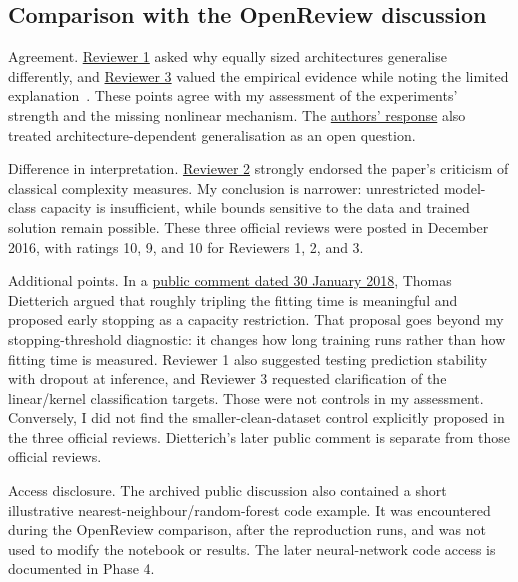 \documentclass[11pt]{article}
\begin{document}
\subsection{Comparison with the OpenReview discussion}

Agreement. \href{https://openreview.net/forum?id=Sy8gdB9xx\&noteId=rJUCC0pQg}{Reviewer 1} asked why equally sized architectures generalise differently, and \href{https://openreview.net/forum?id=Sy8gdB9xx\&noteId=HJwljOv4x}{Reviewer 3} valued the empirical evidence while noting the limited explanation~\cite{openreview_archive}. These points agree with my assessment of the experiments' strength and the missing nonlinear mechanism. The \href{https://openreview.net/forum?id=Sy8gdB9xx\&noteId=HJJR_fQUg}{authors' response} also treated architecture-dependent generalisation as an open question.

Difference in interpretation. \href{https://openreview.net/forum?id=Sy8gdB9xx\&noteId=B1nh-uNVl}{Reviewer 2} strongly endorsed the paper's criticism of classical complexity measures. My conclusion is narrower: unrestricted model-class capacity is insufficient, while bounds sensitive to the data and trained solution remain possible. These three official reviews were posted in December 2016, with ratings 10, 9, and 10 for Reviewers 1, 2, and 3.

Additional points. In a \href{https://openreview.net/forum?id=Sy8gdB9xx\&noteId=S1zRtYaBG}{public comment dated 30 January 2018}, Thomas Dietterich argued that roughly tripling the fitting time is meaningful and proposed early stopping as a capacity restriction. That proposal goes beyond my stopping-threshold diagnostic: it changes how long training runs rather than how fitting time is measured. Reviewer 1 also suggested testing prediction stability with dropout at inference, and Reviewer 3 requested clarification of the linear/kernel classification targets. Those were not controls in my assessment. Conversely, I did not find the smaller-clean-dataset control explicitly proposed in the three official reviews. Dietterich's later public comment is separate from those official reviews.

\noindent Access disclosure. The archived public discussion also contained a short illustrative nearest-neighbour/random-forest code example. It was encountered during the OpenReview comparison, after the reproduction runs, and was not used to modify the notebook or results. The later neural-network code access is documented in Phase 4.
\end{document}
